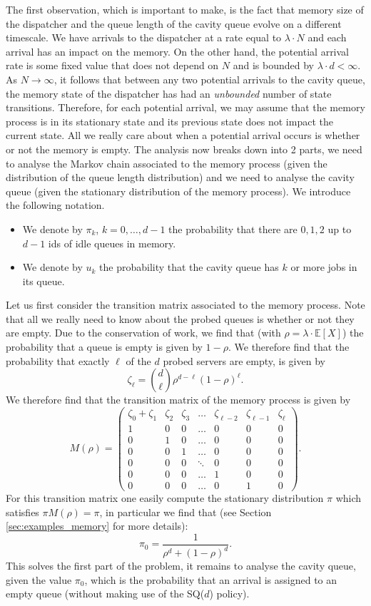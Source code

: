\documentclass[12pt]{report}
\newcommand{\E}{\mathbb{E}}
\begin{document}
The first observation, which is important to make, is the fact that memory size of the dispatcher and the queue length of the cavity queue evolve on a different timescale. We have arrivals to the dispatcher at a rate equal to $\lambda \cdot N$ and each arrival has an impact on the memory. On the other hand, the potential arrival rate is some fixed value that does not depend on $N$ and is bounded by $\lambda \cdot d  < \infty$. As $N\rightarrow \infty$, it follows that between any two potential arrivals to the cavity queue, the memory state of the dispatcher has had an \textit{unbounded} number of state transitions. Therefore, for each potential arrival, we may assume that the memory process is in its stationary state and its previous state does not impact the current state. All we really care about when a potential arrival occurs is whether or not the memory is empty. The analysis now breaks down into 2 parts, we need to analyse the Markov chain associated to the memory process (given the distribution of the queue length distribution) and we need to analyse the cavity queue (given the stationary distribution of the memory process). We introduce the following notation.
\begin{itemize}
	\item We denote by $\pi_k$, $k=0,\dots,d-1$ the probability that there are $0,1,2$ up to $d-1$ ids of idle queues in memory.
	\item We denote by $u_k$ the probability that the cavity queue has $k$ or more jobs in its queue.
\end{itemize}
Let us first consider the transition matrix associated to the memory process. Note that all we really need to know about the probed queues is whether or not they are empty. Due to the conservation of work, we find that (with $\rho = \lambda \cdot \E[X]$) the probability that a queue is empty is given by $1-\rho$. We therefore find that the probability that exactly $\ell$ of the $d$ probed servers are empty, is given by
$$
\zeta_\ell = \binom{d}{\ell} \rho^{d-\ell} (1-\rho)^\ell.
$$
We therefore find that the transition matrix of the memory process is given by
$$
M(\rho) = \begin{pmatrix}
	\zeta_0 + \zeta_1 & \zeta_2 & \zeta_3 & \dots & \zeta_{\ell-2} & \zeta_{\ell-1} & \zeta_\ell \\
	1 & 0 & 0 & \dots & 0 & 0 & 0\\
	0 & 1 & 0 & \dots & 0 & 0 & 0\\
	0 & 0 & 1 & \dots & 0 & 0 & 0\\
	0 & 0 & 0 & \ddots & 0 & 0 & 0\\
	0 & 0 & 0 & \dots & 1 & 0 & 0\\
	0 & 0 & 0 & \dots & 0 & 1 & 0
\end{pmatrix}.
$$
For this transition matrix one easily compute the stationary distribution $\pi$ which satisfies $\pi M(\rho) = \pi$, in particular we find that (see Section \ref{sec:examples_memory} for more details):
$$
\pi_0 = \frac{1}{\rho^d + (1-\rho)^d}.
$$
This solves the first part of the problem, it remains to analyse the cavity queue, given the value $\pi_0$, which is the probability that an arrival is assigned to an empty queue (without making use of the SQ($d$) policy).
\end{document}
